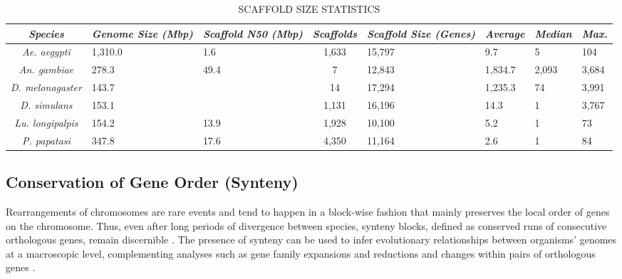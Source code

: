 \begin{table}[H]
  \begin{center}
  \small
  \caption{\label{tab:scaffold-sizes} SCAFFOLD SIZE STATISTICS}
  \begin{tabular}{c p{1.25cm} p{1.25cm} c p{1.25cm} p{1.25cm} p{1.25cm} p{1.25cm}} \hline
    \emph{Species} & \emph{Genome Size (Mbp)} & \emph{Scaffold N50 (Mbp)} & \emph{Scaffolds} & \emph{Scaffold Size (Genes)} & \emph{Average} & \emph{Median} & \emph{Max.} \\ \hline
    \emph{Ae. aegypti} & 1,310.0 & 1.6 & 1,633 & 15,797 & 9.7 & 5 & 104 \\
    \emph{An. gambiae} & 278.3 & 49.4 & 7 & 12,843 & 1,834.7 & 2,093 & 3,684 \\
    \emph{D. melonagaster} & 143.7 & & 14 & 17,294 & 1,235.3 & 74 & 3,991 \\ 
    \emph{D. simulans} & 153.1 & & 1,131 & 16,196 & 14.3 & 1 & 3,767 \\ 
    \emph{Lu. longipalpis} & 154.2 & 13.9 & 1,928 & 10,100 & 5.2 & 1 & 73\\
    \emph{P. papatasi} & 347.8 & 17.6 & 4,350 & 11,164 & 2.6 & 1 & 84
  \end{tabular}
  \end{center}
\end{table}

\subsection{Conservation of Gene Order (Synteny)}
Rearrangements of chromosomes are rare events and tend to happen in a block-wise fashion that mainly preserves the local order of genes on the chromosome. Thus, even after long periods of divergence between species, synteny blocks, defined as conserved runs of consecutive orthologous genes, remain discernible \cite{Heger2007}.  The presence of synteny can be used to infer evolutionary relationships between organisms' genomes at a macroscopic level, complementing analyses such as gene family expansions and reductions and changes within pairs of orthologous genes \cite{Zdobnov2002,Zdobnov2007}.

